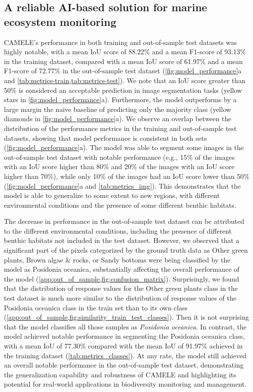 \subsection{A reliable AI-based solution for marine ecosystem monitoring}

CAMELE's performance in both training and out-of-sample test datasets was
highly notable, with a mean IoU score of 88.22\% and a mean F1-score of
93.13\% in the training dataset, compared with a mean IoU score of 61.97\%
and a mean F1-score of 72.77\% in the out-of-sample test dataset
(\cref{fig:model_performance}a and \cref{tab:metrics-train,tab:metrics-test}).
We note that an IoU score greater than 50\% is considered an acceptable
prediction in image segmentation tasks \cite{dai2016instance} (yellow stars in
\cref{fig:model_performance}a). Furthermore, the model outperforms by a large
margin the naive baseline of predicting only the majority class (yellow
diamonds in \cref{fig:model_performance}a). We observe an overlap between the
distribution of the performance metrics in the training and out-of-sample test
datasets, showing that model performance is consistent in both sets
(\cref{fig:model_performance}a). The model was able to segment some images in
the out-of-sample test dataset with notable performance (e.g., 15\% of the
images with an IoU score higher than 80\% and 20\% of the images with an IoU
score higher than 70\%), while only 10\% of the images had an IoU score lower
than 50\% (\cref{fig:model_performance}a and \cref{tab:metrics_img}). This
demonstrates that the model is able to generalize to some extent to new
regions, with different environmental conditions and the presence of some
different benthic habitats.

The decrease in performance in the out-of-sample test dataset can be
attributed to the different environmental conditions, including the
presence of different benthic habitats not included in the test dataset.
However, we observed that a significant part of the pixels categorized by
the ground truth data as Other green plants, Brown algae \& rocks, or Sandy
bottoms were being classified by the model as Posidonia oceanica, substantially
affecting the overall performance of the model
(\cref{app:out_of_sample,fig:confusion_matrix}).
Surprisingly, we found that the distribution of response values for the Other
green plants class in the test dataset is much more similar to the distribution
of response values of the Posidonia oceanica class in the train set
than to its own class
(\cref{app:out_of_sample,fig:similarity_train_test_classes}). Then it is not
surprising that the model classifies all those samples as \textit{Posidonia
    oceanica}. In contrast, the model achieved notable performance in
segmenting the Posidonia oceanica class, with a mean IoU of 77.30\% compared
with the mean IoU of 91.97\% achieved in the training dataset
(\cref{tab:metrics_classes}). At any rate, the model still achieved an overall
notable performance in the out-of-sample test dataset, demonstrating the
generalization capability and robustness of CAMELE and highlighting its
potential for real-world applications in biodiversity monitoring and
management.

